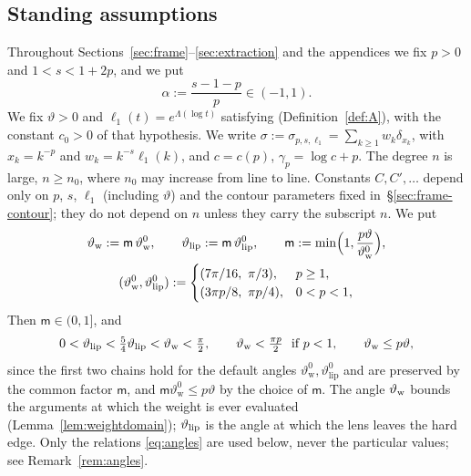 \subsection{Standing assumptions}\label{sec:frame-standing}
Throughout Sections~\ref{sec:frame}--\ref{sec:extraction} and the appendices we fix $p>0$ and $1<s<1+2p$, and we put
\begin{equation}\label{eq:alpha}
  \alpha:=\frac{s-1-p}{p}\in(-1,1).
\end{equation}
We fix $\vartheta>0$ and $\ell_1(t)=e^{\Lambda(\log t)}$ satisfying \Ath{\vartheta} (Definition~\ref{def:A}), with
the constant $c_0>0$ of that hypothesis. We write $\sigma:=\sigma_{p,s,\ell_1}=\sum_{k\ge1}w_k\delta_{x_k}$, with $x_k=k^{-p}$ and
$w_k=k^{-s}\ell_1(k)$, and $c=c(p)$, $\gamma_p=\log c+p$. The degree $n$ is large, $n\ge n_0$, where $n_0$ may
increase from line to line. Constants $C,C',\dots$ depend only on $p$, $s$, $\ell_1$ (including $\vartheta$) and the contour parameters fixed
in~\S\ref{sec:frame-contour}; they do not depend on $n$ unless they carry the subscript $n$. We put
\begin{equation}\label{eq:thetaw}
\begin{gathered}
  \thw:=\mathsf m\,\vartheta_{\mathrm w}^{0},\qquad \thlip:=\mathsf m\,\vartheta_{\mathrm{lip}}^{0},\qquad
  \mathsf m:=\min\Bigl(1,\frac{p\vartheta}{\vartheta_{\mathrm w}^{0}}\Bigr),\\
  (\vartheta_{\mathrm w}^{0},\vartheta_{\mathrm{lip}}^{0}):=\begin{cases}(7\pi/16,\ \pi/3),&p\ge1,\\ (3\pi p/8,\ \pi p/4),&0<p<1,\end{cases}
\end{gathered}
\end{equation}
Then $\mathsf m\in(0,1]$, and
\begin{equation}\label{eq:angles}
  0<\vartheta_{\mathrm{lip}}<\tfrac54\vartheta_{\mathrm{lip}}<\vartheta_{\mathrm{w}}<\tfrac\pi2,\qquad \vartheta_{\mathrm{w}}<\tfrac{\pi p}2\ \text{ if }p<1,\qquad \vartheta_{\mathrm{w}}\le p\vartheta ,
\end{equation}
since the first two chains hold for the default angles $\vartheta_{\mathrm w}^{0},\vartheta_{\mathrm{lip}}^{0}$ and are
preserved by the common factor $\mathsf m$, and $\mathsf m\vartheta_{\mathrm w}^{0}\le p\vartheta$ by the choice of
$\mathsf m$. The angle $\vartheta_{\mathrm{w}}$ bounds the arguments at which the weight is ever evaluated
(Lemma~\ref{lem:weightdomain}); $\vartheta_{\mathrm{lip}}$ is the angle at which the lens leaves the hard edge. Only the relations
\eqref{eq:angles} are used below, never the particular values; see Remark~\ref{rem:angles}.

